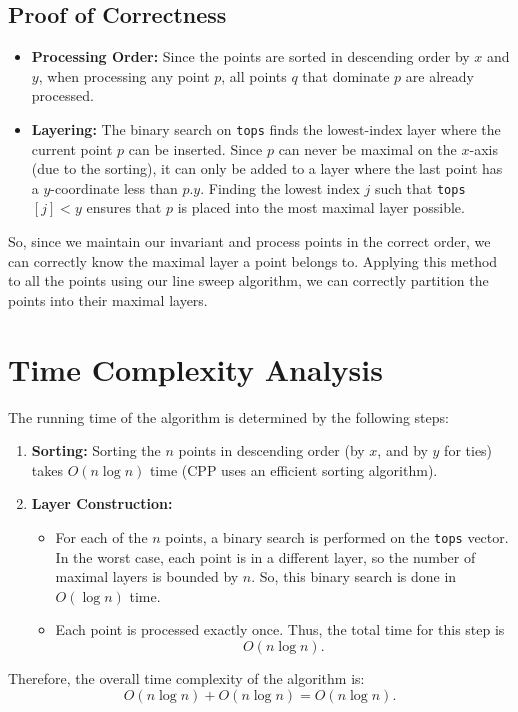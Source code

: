 \documentclass[a4paper]{article}
\begin{document}
\vspace{2mm}
\subsection*{Proof of Correctness}
\begin{itemize}
    \item \textbf{Processing Order:} Since the points are sorted in descending order by $x$ and $y$, when processing any point $p$, all points $q$ that dominate $p$ are already processed. 
    
    \item \textbf{Layering:} The binary search on \texttt{tops} finds the lowest-index layer where the current point $p$ can be inserted. Since $p$ can never be maximal on the $x$-axis (due to the sorting), it can only be added to a layer where the last point has a $y$-coordinate less than $p.y$. Finding the lowest index $j$ such that \texttt{tops}$[j] < y$ ensures that $p$ is placed into the most maximal layer possible.
\end{itemize}

\noindent So, since we maintain our invariant and process points in the correct order, we can correctly know the maximal layer a point belongs to. Applying this method to all the points using our line sweep algorithm, we can correctly partition the points into their maximal layers.

\vspace{2mm}
\section*{Time Complexity Analysis}

The running time of the algorithm is determined by the following steps:
\begin{enumerate}[label=\arabic*.]
    \item \textbf{Sorting:} Sorting the $n$ points in descending order (by $x$, and by $y$ for ties) takes $O(n \log n)$ time (CPP uses an efficient sorting algorithm).
    
    \item \textbf{Layer Construction:} 
    \begin{itemize}
        \item For each of the $n$ points, a binary search is performed on the \texttt{tops} vector. In the worst case, each point is in a different layer, so the number of maximal layers is bounded by $n$. So, this binary search is done in $O(\log n)$ time.
        \item Each point is processed exactly once. Thus, the total time for this step is 
        \[
        O(n \log n).
        \]
    \end{itemize}
\end{enumerate}

\medskip
\noindent Therefore, the overall time complexity of the algorithm is:
\[
O(n \log n) + O(n \log n) = O(n \log n).
\]
\end{document}

